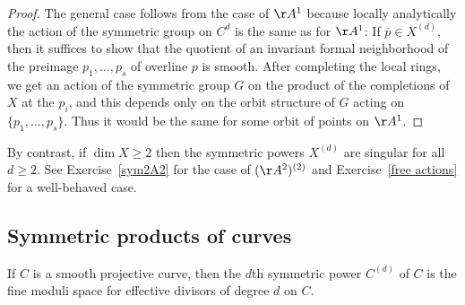 \begin{proof}
 The general case follows from the case of $\AA^{1}$ because locally analytically the action of the symmetric group on $C^d$ is the same as for $\AA^1$: If  $\overline p \in X^{(d)}$, then it suffices to
 show that the quotient of an invariant formal neighborhood of the preimage $p_1,\dots, p_s$ of
 overline $p$ is smooth. After completing the local rings, we get an action of the symmetric group
 $G$ on the product of the completions of $X$ at the $p_i$, and this depends only on the orbit
 structure of $G$ acting on $\{p_1,\dots, p_s\}$. Thus it would be the same for some orbit of
 points on $\AA^1$.
 \end{proof}

By contrast, if $\dim X \geq 2$ then the symmetric powers $X^{(d)}$ are singular for all $d \geq 2$.
See Exercise~\ref{sym2A2} for the case of $(\AA^2)^{(2)}$ and Exercise~\ref{free actions} for a well-behaved case.




\subsection{Symmetric products of curves}

\begin{fact} \cite[Remark 9.3.9]{Kleiman-PicardScheme}
If $C$ is a smooth projective curve, then the $d$th symmetric power $C^{(d)}$ of $C$ is the fine moduli space for effective divisors of degree $d$ on $C$.

\end{fact}



%
%

